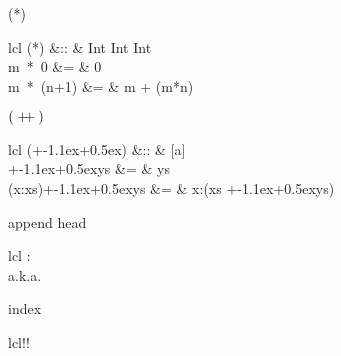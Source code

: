 \documentclass[avery5371,grid]{flashcards}
\newcommand{\fl}[2]{\begin{flashcard}{#1}{\begin{array}{lcl}#2\end{array}}\end{flashcard}}
\newcommand\doubleplus{+\kern-1.1ex+\kern0.5ex}
\begin{document}
\fl{(*)}{
(*)			&::	&	Int \rightarrow Int \rightarrow Int\\
m~*~0		&=	&	0\\
m~*~(n+1)	&=	&	m + (m*n)
}

\fl{\(({}\doubleplus{})\)}{
({}\doubleplus{})					&::	&	[a] \rightarrow [a] \rightarrow [a]\\
\lbrack\rbrack \doubleplus ys		&=	&	ys\\
(x:xs)\doubleplus ys				&=	&	x:(xs \doubleplus ys)
}

\fl{append head}{
:\\
a.k.a.~}

\fl{index}{!!}

\end{document}
